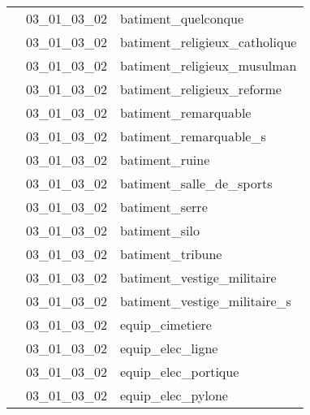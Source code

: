\documentclass[12pt,titlepage]{book}
\begin{document}
\begin{supertabular}{|p{10cm}|c|p{15cm}|}
                    & 03\_01\_03\_02 & batiment\_quelconque\\


                    & 03\_01\_03\_02 & batiment\_religieux\_catholique\\


                    & 03\_01\_03\_02 & batiment\_religieux\_musulman\\


                    & 03\_01\_03\_02 & batiment\_religieux\_reforme\\


                    & 03\_01\_03\_02 & batiment\_remarquable\\


                    & 03\_01\_03\_02 & batiment\_remarquable\_s\\


                    & 03\_01\_03\_02 & batiment\_ruine\\


                    & 03\_01\_03\_02 & batiment\_salle\_de\_sports\\


                    & 03\_01\_03\_02 & batiment\_serre\\


                    & 03\_01\_03\_02 & batiment\_silo\\


                    & 03\_01\_03\_02 & batiment\_tribune\\


                    & 03\_01\_03\_02 & batiment\_vestige\_militaire\\


                    & 03\_01\_03\_02 & batiment\_vestige\_militaire\_s\\


                    & 03\_01\_03\_02 & equip\_cimetiere\\


                    & 03\_01\_03\_02 & equip\_elec\_ligne\\


                    & 03\_01\_03\_02 & equip\_elec\_portique\\


                    & 03\_01\_03\_02 & equip\_elec\_pylone\\



\end{supertabular}
\end{document}
